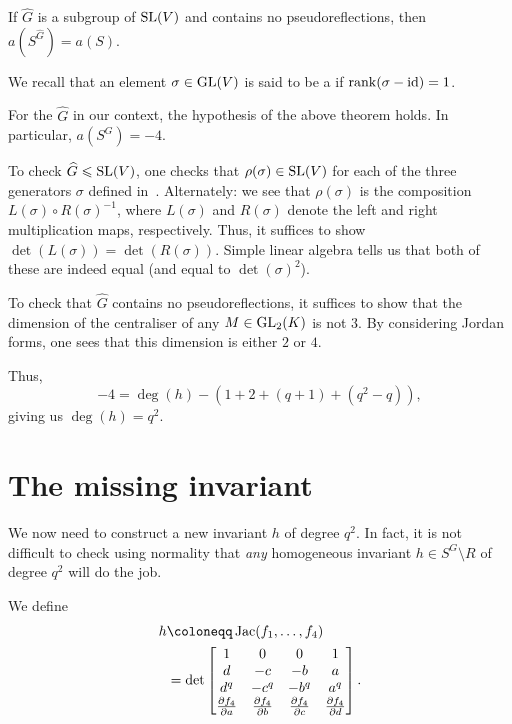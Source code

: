 \documentclass[12pt]{article}
\begin{document}
	\begin{thm}
		If $\widehat{G}$ is a subgroup of $\operatorname{SL}(V)$ and contains no pseudoreflections, then $a(S^{\widehat{G}}) = a(S)$.
	\end{thm}
	We recall that an element $\sigma \in \operatorname{GL}(V)$ is said to be a  if $\operatorname{rank}(\sigma - \operatorname{id}) = 1$.

	\begin{prop}
		For the $\widehat{G}$ in our context, the hypothesis of the above theorem holds. 
		In particular, $a(S^{G}) = -4$.
	\end{prop}
	\begin{sketch} 
		To check $\widehat{G} \leqslant \operatorname{SL}(V)$, one checks that $\rho(\sigma) \in \operatorname{SL}(V)$ for each of the three generators $\sigma$ defined in~. 
		Alternately: we see that $\rho(\sigma)$ is the composition $L(\sigma) \circ R(\sigma)^{-1}$, where $L(\sigma)$ and $R(\sigma)$ denote the left and right multiplication maps, respectively. 
		Thus, it suffices to show $\det(L(\sigma)) = \det(R(\sigma))$. 
		Simple linear algebra tells us that both of these are indeed equal (and equal to $\det(\sigma)^{2}$).

		To check that $\widehat{G}$ contains no pseudoreflections, it suffices to show that the dimension of the centraliser of any $M \in \operatorname{GL}_{2}(K)$ is not $3$. 
		By considering Jordan forms, one sees that this dimension is either $2$ or $4$.
	\end{sketch}

	Thus,
	\begin{equation*} 
		-4 = \deg(h) - (1 + 2 + (q+1) + (q^{2} - q)),
	\end{equation*}
	giving us $\deg(h) = q^{2}$.

\section{The missing invariant}
	
	We now need to construct a new invariant $h$ of degree $q^{2}$. 
	In fact, it is not difficult to check using normality that \emph{any} homogeneous invariant $h \in S^{G} \setminus R$ of degree $q^{2}$ will do the job.

	We define
	\begin{align} 
		h &\coloneqq \Jac(f_{1}, \ldots, f_{4}) \nonumber \\
		&= \det 
		\begin{bmatrix}
			1 & 0 & 0 & 1 \\
			d & -c & -b & a \\
			d^{q} & -c^{q} & -b^{q} & a^{q} \\
			\frac{\partial f_{4}}{\partial a} & \frac{\partial f_{4}}{\partial b} & \frac{\partial f_{4}}{\partial c} & \frac{\partial f_{4}}{\partial d} \\
		\end{bmatrix}.
		\label{eq:002}
	\end{align}
\end{document}
